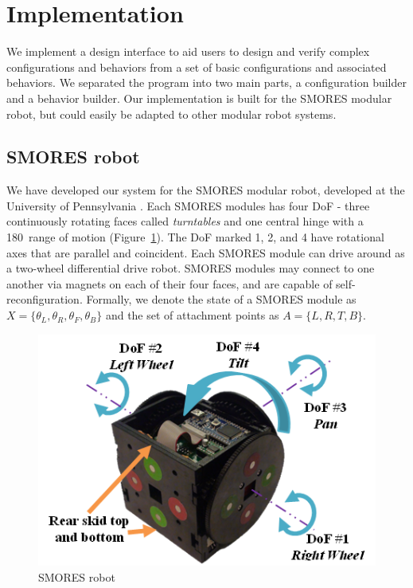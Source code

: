 \documentclass[conference]{IEEEtran}
\theoremstyle{definition}
\begin{document}
\section{Implementation }
\label{sec:implementation}
We implement a design interface to aid users to design and verify complex configurations and behaviors from a set of basic configurations and associated behaviors. We separated the program into two main parts, a configuration builder and a behavior builder.
Our implementation is built for the SMORES modular robot, but could easily be adapted
to other modular robot systems. \subsection{SMORES robot}
We have developed our system for the SMORES modular robot, developed at the
University of Pennsylvania \cite{Davey2012}. Each SMORES modules has four DoF
- three continuously rotating faces called {\em turntables} and one
central hinge with a 180\textdegree\ range of motion (Figure~\ref{fig:SmoresRobot}). The
DoF marked 1, 2, and 4 have rotational axes that are parallel and coincident.
Each SMORES module can drive around as a two-wheel differential
drive robot.
SMORES modules may connect to one another via magnets on each of their four
faces, and are capable of  self-reconfiguration.
Formally, we denote the state of a SMORES module as \(X=\lbrace \theta_L, \theta_R,
\theta_F, \theta_B \rbrace\) and the set of attachment points as \(A=\lbrace L,R,T,B \rbrace\).




\begin{figure}[tb]
    \begin{center}
        \includegraphics[width=0.8\columnwidth]{images/smores_robot.png}
    \end{center}
    \caption{SMORES robot}
    \label{fig:SmoresRobot}
\end{figure}
\end{document}
